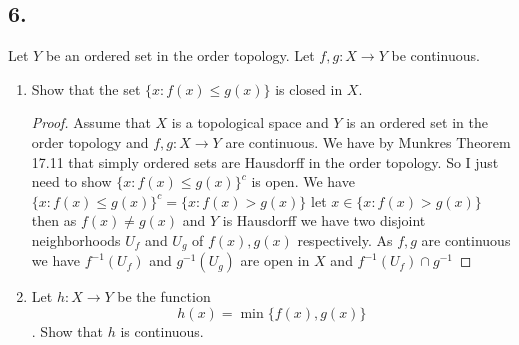 \documentclass{amsart}
\theoremstyle{plain}
\theoremstyle{definition}
\theoremstyle{remark}
\begin{document}
\subsection*{6.} Let $Y$ be an ordered set in the order topology. Let $f,g:X\to Y$ be continuous.
\begin{enumerate}
    \item Show that the set $\{x: f(x)\leq g(x)\}$ is closed in $X$.
    \begin{proof}
        Assume that $X$ is a topological space and $Y$ is an ordered set in the order topology and $f,g:X\to Y$ are continuous. We have by Munkres Theorem 17.11 that simply ordered sets are Hausdorff in the order topology. So I just need to show $\{x: f(x)\leq g(x)\}^c$ is open. We have $\{x: f(x)\leq g(x)\}^c=\{x: f(x)>g(x)\}$ let $x\in \{x: f(x)>g(x)\} $ then as $f(x)\not = g(x)$ and $Y$ is Hausdorff we have two disjoint neighborhoods $U_f$ and $U_g$ of $f(x),g(x)$ respectively. As $f,g$ are continuous we have $f^{-1}(U_f)$ and $g^{-1}(U_g)$ are open in $X$ and $f^{-1}(U_f)\cap g^{-1}$ 
    \end{proof}


    \item Let $h:X\to Y$ be the function \[ h(x)=\min \{f(x),g(x)\}\]. Show that $h$ is continuous. 
\end{enumerate}

 
\end{document}
